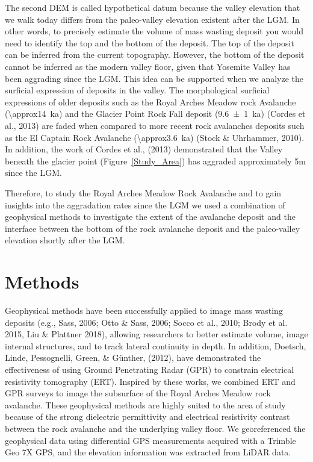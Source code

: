 \documentclass[5p]{elsarticle}
\begin{document}
The second DEM is called hypothetical datum because the valley elevation that we walk today differs from the paleo-valley elevation existent after the LGM. In other words, to precisely estimate the volume of mass wasting deposit you would need to identify the top and the bottom of the deposit. The top of the deposit can be inferred from the current topography. However, the bottom of the deposit cannot be inferred as the modern valley floor, given that Yosemite Valley has been aggrading since the LGM. This idea can be supported when we analyze the surficial expression of deposits in the valley. The morphological surficial expressions of older deposits such as the Royal Arches Meadow rock Avalanche (\SI{\approx14}{\kilo a}) and the Glacier Point Rock Fall deposit (\SI{9.6 \pm 1}{\kilo a}) (Cordes et al., 2013) are faded when compared to more recent rock avalanches deposits such as the El Captain Rock Avalanche (\SI{\approx3.6}{\kilo a}) (Stock \& Uhrhammer, 2010). In addition, the work of Cordes et al., (2013) demonstrated that the Valley beneath the glacier point (Figure~\ref{Study_Area}) has aggraded approximately 5m since the LGM.

Therefore, to study the Royal Arches Meadow Rock Avalanche and to gain insights into the aggradation rates since the LGM we used a combination of geophysical methods to investigate the extent of the avalanche deposit and the interface between the bottom of the rock avalanche deposit and the paleo-valley elevation shortly after the LGM.



\section{Methods}

Geophysical methods have been successfully applied to image mass wasting deposits  (e.g., Sass, 2006; Otto \& Sass, 2006; Socco et al., 2010; Brody et al. 2015, Liu \& Plattner 2018), allowing researchers to better estimate volume, image internal structures, and to track lateral continuity in depth. In addition, Doetsch, Linde, Pessognelli, Green, \& G\"unther, (2012), have demonstrated the effectiveness of using Ground Penetrating Radar (GPR) to constrain electrical resistivity tomography (ERT). Inspired by these works, we combined ERT and GPR surveys to image the subsurface of the Royal Arches Meadow rock avalanche. These geophysical methods are highly suited to the area of study because of the strong dielectric permittivity and electrical resistivity contrast between the rock avalanche and the underlying valley floor. We georeferenced the geophysical data using differential GPS measurements acquired with a Trimble Geo 7X GPS, and the elevation information was extracted from LiDAR data.
\end{document}
